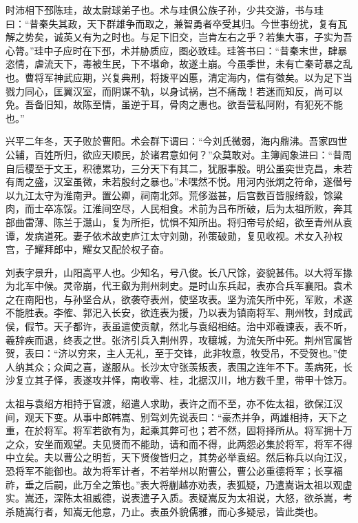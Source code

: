 \documentclass[12pt,UTF8]{ctexbook}
\begin{document}
时沛相下邳陈珪，故太尉球弟子也。术与珪俱公族子孙，少共交游，书与珪曰：“昔秦失其政，天下群雄争而取之，兼智勇者卒受其归。今世事纷扰，复有瓦解之势矣，诚英乂有为之时也。与足下旧交，岂肯左右之乎？若集大事，子实为吾心膂。”珪中子应时在下邳，术并胁质应，图必致珪。珪答书曰：“昔秦末世，肆暴恣情，虐流天下，毒被生民，下不堪命，故遂土崩。今虽季世，未有亡秦苛暴之乱也。曹将军神武应期，兴复典刑，将拨平凶慝，清定海内，信有徵矣。以为足下当戮力同心，匡翼汉室，而阴谋不轨，以身试祸，岂不痛哉！若迷而知反，尚可以免。吾备旧知，故陈至情，虽逆于耳，骨肉之惠也。欲吾营私阿附，有犯死不能也。”

兴平二年冬，天子败於曹阳。术会群下谓曰：“今刘氏微弱，海内鼎沸。吾家四世公辅，百姓所归，欲应天顺民，於诸君意如何？”众莫敢对。主簿阎象进曰：“昔周自后稷至于文王，积德累功，三分天下有其二，犹服事殷。明公虽奕世克昌，未若有周之盛，汉室虽微，未若殷纣之暴也。”术嘿然不悦。用河内张炯之符命，遂僣号以九江太守为淮南尹。置公卿，祠南北郊。荒侈滋甚，后宫数百皆服绮縠，馀粱肉，而士卒冻馁。江淮间空尽，人民相食。术前为吕布所破，后为太祖所败，奔其部曲雷薄、陈兰于灊山，复为所拒，忧惧不知所出。将归帝号於绍，欲至青州从袁谭，发病道死。妻子依术故吏庐江太守刘勋，孙策破勋，复见收视。术女入孙权宫，子耀拜郎中，耀女又配於权子奋。

刘表字景升，山阳高平人也。少知名，号八俊。长八尺馀，姿貌甚伟。以大将军掾为北军中候。灵帝崩，代王叡为荆州刺史。是时山东兵起，表亦合兵军襄阳。袁术之在南阳也，与孙坚合从，欲袭夺表州，使坚攻表。坚为流矢所中死，军败，术遂不能胜表。李傕、郭汜入长安，欲连表为援，乃以表为镇南将军、荆州牧，封成武侯，假节。天子都许，表虽遣使贡献，然北与袁绍相结。治中邓羲谏表，表不听，羲辞疾而退，终表之世。张济引兵入荆州界，攻穰城，为流矢所中死。荆州官属皆贺，表曰：“济以穷来，主人无礼，至于交锋，此非牧意，牧受吊，不受贺也。”使人纳其众；众闻之喜，遂服从。长沙太守张羡叛表，表围之连年不下。羡病死，长沙复立其子怿，表遂攻并怿，南收零、桂，北据汉川，地方数千里，带甲十馀万。

太祖与袁绍方相持于官渡，绍遣人求助，表许之而不至，亦不佐太祖，欲保江汉间，观天下变。从事中郎韩嵩、别驾刘先说表曰：“豪杰并争，两雄相持，天下之重，在於将军。将军若欲有为，起乘其弊可也；若不然，固将择所从。将军拥十万之众，安坐而观望。夫见贤而不能助，请和而不得，此两怨必集於将军，将军不得中立矣。夫以曹公之明哲，天下贤俊皆归之，其势必举袁绍。然后称兵以向江汉，恐将军不能御也。故为将军计者，不若举州以附曹公，曹公必重德将军；长享福祚，垂之后嗣，此万全之策也。”表大将蒯越亦劝表，表狐疑，乃遣嵩诣太祖以观虚实。嵩还，深陈太祖威德，说表遣子入质。表疑嵩反为太祖说，大怒，欲杀嵩，考杀随嵩行者，知嵩无他意，乃止。表虽外貌儒雅，而心多疑忌，皆此类也。
\end{document}
